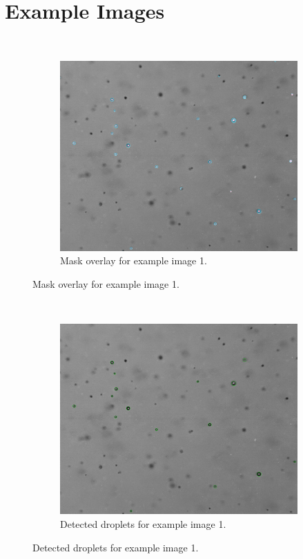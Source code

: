 \chapter{Example Images}
~
\vfill
\begin{figure}[htbp]\ContinuedFloat*
    \centering
    \begin{subfigure}{\textwidth}
        \centering
            \includegraphics[width=\textwidth]{images/samples/36dbm_C001H001S0001000046_leftImg8bit_overlay.jpeg}
        \caption{Mask overlay for example image 1.}
    \end{subfigure}
\end{figure}
\vfill
~
\vfill
\begin{figure}[htbp]\ContinuedFloat
    \begin{subfigure}{\textwidth}
        \centering
            \includegraphics[width=\textwidth]{images/samples/36dbm_C001H001S0001000046_leftImg8bit_detected.jpeg}
        \caption{Detected droplets for example image 1.}
    \end{subfigure}
\end{figure}

